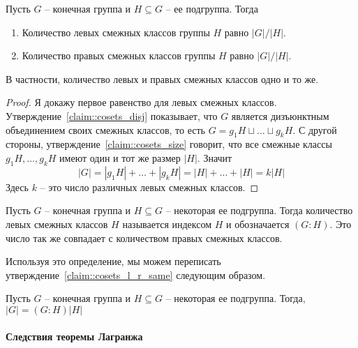 \begin{claim}
\label{claim::cosets_l_r_same}
Пусть $G$ -- конечная группа и $H\subseteq G$ -- ее подгруппа.
Тогда
\begin{enumerate}
\item Количество левых смежных классов группы $H$ равно $|G|/|H|$.

\item Количество правых смежных классов группы $H$ равно $|G|/|H|$.
\end{enumerate}
В частности, количество левых и правых смежных классов одно и то же.
\end{claim}
\begin{proof}
Я докажу первое равенство для левых смежных классов.
Утверждение~\ref{claim::cosets_disj} показывает, что  $G$ является дизъюнктным объединением своих смежных классов, то есть $G = g_1 H \sqcup \ldots \sqcup g_k H$.
С другой стороны, утверждение~\ref{claim::cosets_size} говорит, что все смежные классы $g_1H,\ldots, g_kH$ имеют один и тот же размер $|H|$.
Значит
\[
|G| = |g_1H| + \ldots +|g_k H| = |H| + \ldots + |H| = k |H|
\]
Здесь $k$ -- это число различных левых смежных классов.
\end{proof}

\begin{definition}
Пусть $G$ -- конечная группа и $H\subseteq G$ -- некоторая ее подгруппа.
Тогда количество левых смежных классов $H$ называется индексом $H$ и обозначается $(G:H)$.
Это число так же совпадает с количеством правых смежных классов.
\end{definition}

Используя это определение, мы можем переписать утверждение~\ref{claim::cosets_l_r_same} следующим образом.

\begin{claim}
Пусть $G$ -- конечная группа и $H\subseteq G$ -- некоторая ее подгруппа.
Тогда, $|G| = (G : H)|H|$
\end{claim}


\paragraph{Следствия теоремы Лагранжа}

